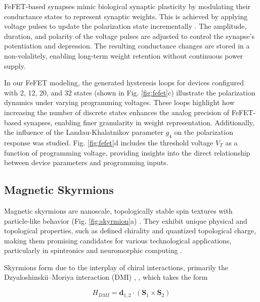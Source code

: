 \documentclass[conference]{IEEEtran}
\begin{document}
FeFET-based synapses mimic biological synaptic plasticity by modulating their conductance states to represent synaptic weights. This is achieved by applying voltage pulses to update the polarization state incrementally \cite{jerry_ferroelectric_2017}. The amplitude, duration, and polarity of the voltage pulses are adjusted to control the synapse's potentiation and depression. The resulting conductance changes are stored in a non-volalitely, enabling long-term weight retention without continuous power supply.

In our FeFET modeling, the generated hysteresis loops for devices configured with 2, 12, 20, and 32 states (shown in Fig. \ref{fig:fefet}c) illustrate the polarization dynamics under varying programming voltages. These loops highlight how increasing the number of discrete states enhances the analog precision of FeFET-based synapses, enabling finer granularity in weight representation. Additionally, the influence of the Landau-Khalatnikov parameter $g_4$ on the polarization response was studied. Fig. \ref{fig:fefet}d includes the threshold voltage $V_T$ as a function of programming voltage, providing insights into the direct relationship between device parameters and programming inputs. 

\subsection{Magnetic Skyrmions}
Magnetic skyrmions are nanoscale, topologically stable spin textures with particle-like behavior (Fig. \ref{fig:skyrmion}a) \cite{huang_magnetic_2017}\cite{hu_magnetic_2023}\cite{fert_magnetic_2017}. They exhibit unique physical and topological properties, such as defined chirality and quantized topological charge, making them promising candidates for various technological applications, particularly in spintronics and neuromorphic computing \cite{song_skyrmion-based_2020}\cite{vakili_skyrmionicscomputing_2021}\cite{li_magnetic_2017}.

Skyrmions form due to the interplay of chiral interactions, primarily the Dzyaloshinskii–Moriya interaction (DMI) \cite{dzyaloshinsky_thermodynamic_1958}, \cite{moriya_anisotropic_1960}, which takes the form

\begin{equation}
\label{dmi}
H_{DMI} = \bm{d}_{1,2} \cdot (\bm{S}_1 \times \bm{S}_2)
\end{equation}
\end{document}
